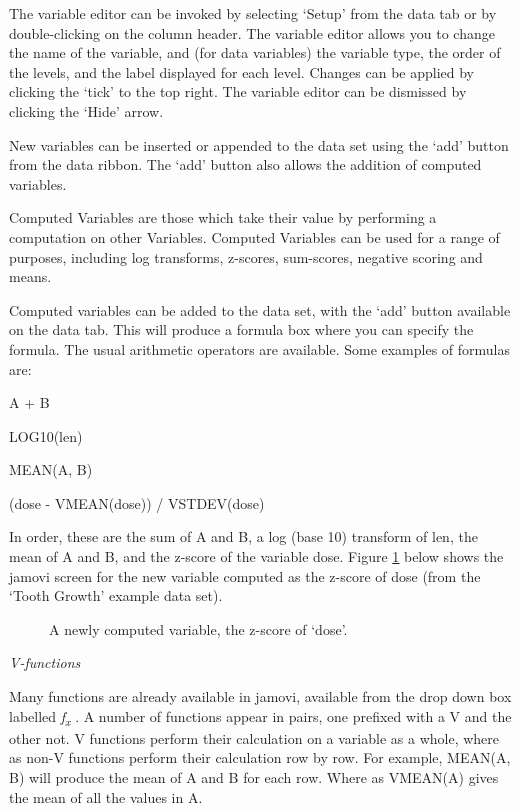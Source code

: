 The variable editor can be invoked by selecting ‘Setup’ from the data tab or by double-clicking on the column header. The variable editor allows you to change the name of the variable, and (for data variables) the variable type, the order of the levels, and the label displayed for each level. Changes can be applied by clicking the ‘tick’ to the top right. The variable editor can be dismissed by clicking the `Hide' arrow.

New variables can be inserted or appended to the data set using the ‘add’ button from the data ribbon. The ‘add’ button also allows the addition of computed variables.



Computed Variables are those which take their value by performing a computation on other Variables. Computed Variables can be used for a range of purposes, including log transforms, z-scores, sum-scores, negative scoring and means.

Computed variables can be added to the data set, with the ‘add’ button available on the data tab. This will produce a formula box where you can specify the formula. The usual arithmetic operators are available. Some examples of formulas are:

A + B

LOG10(len)

MEAN(A, B)

(dose - VMEAN(dose)) / VSTDEV(dose)

In order, these are the sum of A and B, a log (base 10) transform of len, the mean of A and B, and the z-score of the variable dose. Figure \ref{fig:computedvariable} below shows the jamovi screen for the new variable computed as the z-score of dose (from the `Tooth Growth' example data set).

\vspace*{1cm}
\begin{figure}[h]
\begin{center}
\caption{A newly computed variable, the z-score of `dose'.}
\label{fig:computedvariable}
\end{center}
\end{figure}


{\it V-functions}

Many functions are already available in jamovi, available from the drop down box labelled {\it f\textsubscript{x}} . A number of functions appear in pairs, one prefixed with a V and the other not. V functions perform their calculation on a variable as a whole, where as non-V functions perform their calculation row by row. For example, MEAN(A, B) will produce the mean of A and B for each row. Where as VMEAN(A) gives the mean of all the values in A.

